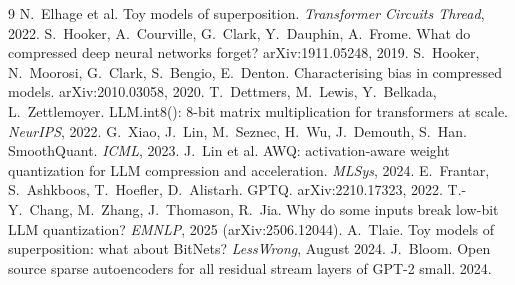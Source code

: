 \documentclass{article}
\begin{document}
\begin{thebibliography}{9}\small
{} N.~Elhage et al. Toy models of superposition. \emph{Transformer Circuits Thread}, 2022.
 S.~Hooker, A.~Courville, G.~Clark, Y.~Dauphin, A.~Frome. What do compressed deep neural networks forget? arXiv:1911.05248, 2019.
 S.~Hooker, N.~Moorosi, G.~Clark, S.~Bengio, E.~Denton. Characterising bias in compressed models. arXiv:2010.03058, 2020.
 T.~Dettmers, M.~Lewis, Y.~Belkada, L.~Zettlemoyer. LLM.int8(): 8-bit matrix multiplication for transformers at scale. \emph{NeurIPS}, 2022.
 G.~Xiao, J.~Lin, M.~Seznec, H.~Wu, J.~Demouth, S.~Han. SmoothQuant. \emph{ICML}, 2023.
 J.~Lin et al. AWQ: activation-aware weight quantization for LLM compression and acceleration. \emph{MLSys}, 2024.
 E.~Frantar, S.~Ashkboos, T.~Hoefler, D.~Alistarh. GPTQ. arXiv:2210.17323, 2022.
 T.-Y.~Chang, M.~Zhang, J.~Thomason, R.~Jia. Why do some inputs break low-bit LLM quantization? \emph{EMNLP}, 2025 (arXiv:2506.12044).
 A.~Tlaie. Toy models of superposition: what about BitNets? \emph{LessWrong}, August 2024.
 J.~Bloom. Open source sparse autoencoders for all residual stream layers of GPT-2 small. 2024.
\end{thebibliography}

\appendix
\end{document}
